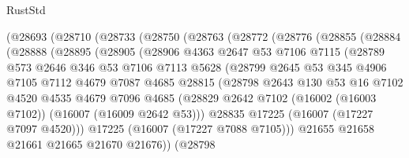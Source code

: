 \begin{lexlean}{RustStd}
\begin{coremodule}
      (@28693
        (@28710
          (@28733
            (@28750
              (@28763
                (@28772
                  (@28776
                    (@28855
                      (@28884
                        (@28888
                          (@28895
                            (@28905
                              (@28906
                                @4363
                                @2647
                                @53
                                @7106
                                @7115
                                (@28789
                                  @573
                                  @2646
                                  @346
                                  @53
                                  @7106
                                  @7113
                                  @5628
                                  (@28799
                                    @2645
                                    @53
                                    @345
                                    @4906
                                    @7105
                                    @7112
                                    @4679
                                    @7087
                                    @4685
                                    @28815
                                    (@28798
                                      @2643
                                      @130
                                      @53
                                      @16
                                      @7102
                                      @4520
                                      @4535
                                      @4679
                                      @7096
                                      @4685
                                      (@28829
                                        @2642
                                        @7102
                                        (@16002 (@16003 @7102))
                                        (@16007 (@16009 @2642 @53)))
                                      @28835
                                      @17225
                                      (@16007 (@17227 @7097 @4520)))
                                    @17225
                                    (@16007 (@17227 @7088 @7105)))
                                  @21655
                                  @21658
                                  @21661
                                  @21665
                                  @21670
                                  @21676))
                              (@28798

\end{coremodule}
\end{lexlean}
